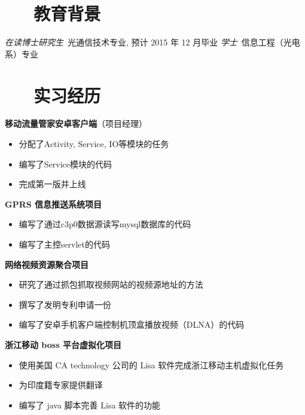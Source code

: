 \documentclass{resume}
\begin{document}


 
\section{\faGraduationCap\  ~~教育背景}
\textit{在读博士研究生}\ 光通信技术专业, 预计 2015 年 12 月毕业
\textit{学士}\ 信息工程（光电系）专业

\section{\faUsers\ ~~实习经历}

\vspace{2mm}
\textbf{移动流量管家安卓客户端}（项目经理）
\begin{itemize}[parsep=0.5ex]
  \item 分配了Activity, Service, IO等模块的任务
  \item 编写了Service模块的代码
  \item 完成第一版并上线
\end{itemize}

\vspace{2mm}
\textbf{GPRS 信息推送系统项目}
\begin{itemize}[parsep=0.5ex]
  \item 编写了通过c3p0数据源读写mysql数据库的代码
  \item 编写了主控servlet的代码
\end{itemize}

\vspace{2mm}
\textbf{网络视频资源聚合项目}
\begin{itemize}[parsep=0.5ex]
  \item 研究了通过抓包抓取视频网站的视频源地址的方法
  \item 撰写了发明专利申请一份
  \item 编写了安卓手机客户端控制机顶盒播放视频（DLNA）的代码
\end{itemize}

\vspace{2mm}
\textbf{浙江移动 boss 平台虚拟化项目}
\begin{itemize}[parsep=0.5ex]
  \item 使用美国 CA technology 公司的 Lisa 软件完成浙江移动主机虚拟化任务
  \item 为印度籍专家提供翻译
  \item 编写了 java 脚本完善 Lisa 软件的功能
\end{itemize}
\end{document}
